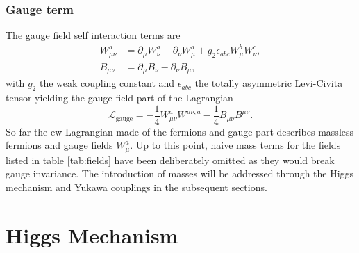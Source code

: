 \subsubsection*{Gauge term}
The gauge field self interaction terms are
\begin{align}
    W_{\mu\nu}^a & =\partial_\mu W_\nu^a-\partial_\nu W_\mu^a+g_2\epsilon_{abc}W_\mu^b W_\nu^c, \\
    B_{\mu\nu}   & =\partial_\mu B_\nu-\partial_\nu B_\mu,
\end{align}
with $g_2$ the weak coupling constant and $\epsilon_{abc}$ the totally asymmetric Levi-Civita tensor yielding the gauge field part of the Lagrangian
\begin{equation}
    \mathcal {L}_\text{gauge} = -\frac{1}{4} W_{\mu\nu}^a W^{\mu\nu,a} - \frac{1}{4}B_{\mu\nu}B^{\mu\nu}.
\end{equation}
So far the \ac{ew} Lagrangian made of the fermions and gauge part describes massless fermions and gauge fields $W^a_\mu$. Up to this point, naive mass terms for the fields listed in table \ref{tab:fields} have been deliberately omitted as they would break gauge invariance. The introduction of masses will be addressed through the Higgs mechanism and Yukawa couplings in the subsequent sections.



\section{Higgs Mechanism}\label{sec:higgs_mechanism}

